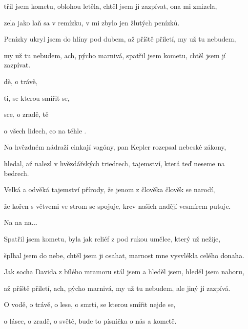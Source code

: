

\zs
{}třil jsem kometu, oblohou letěla,
chtěl jsem jí zazpívat, ona mi zmizela,

zela jako laň sa v remízku,
v  mi zbylo jen  žlutých penízků.
\ks

\zs
Penízky ukryl jsem do hlíny pod dubem,
až příště přiletí, my už tu nebudem,

my už tu nebudem, ach, pýcho marnivá,
spatřil jsem kometu, chtěl jsem jí zazpívat.
\ks

\zr
{}dě, o trávě, 

ti, se kterou smířit  se,

sce, o zradě, tě

 o všech lidech, co  na téhle .
\kr

\zs
Na hvězdném nádraží cinkají vagóny,
pan Kepler rozepsal nebeské zákony,

hledal, až nalezl v hvězdářských triedrech,
tajemství, která teď neseme na bedrech.
\ks

\zs
Velká a odvěká tajemství přírody,
že jenom z člověka člověk se narodí,

že kořen s větvemi ve strom se spojuje,
krev našich nadějí vesmírem putuje.
\ks

\zr
Na na na...
\kr

\zs
Spatřil jsem kometu, byla jak reliéf
z pod rukou umělce, který už nežije,

šplhal jsem do nebe, chtěl jsem ji osahat,
marnost mne vysvlékla celého donaha.
\ks

\zs
Jak socha Davida z bílého mramoru
stál jsem a hleděl jsem, hleděl jsem nahoru,

až příště přiletí, ach, pýcho marnivá,
my už tu nebudem, ale jiný jí zazpívá.
\ks

\zr
O vodě, o trávě, o lese,
o smrti, se kterou smířit nejde se,

o lásce, o zradě, o světě,
bude to písnička o nás a kometě.
\kr

\kp





